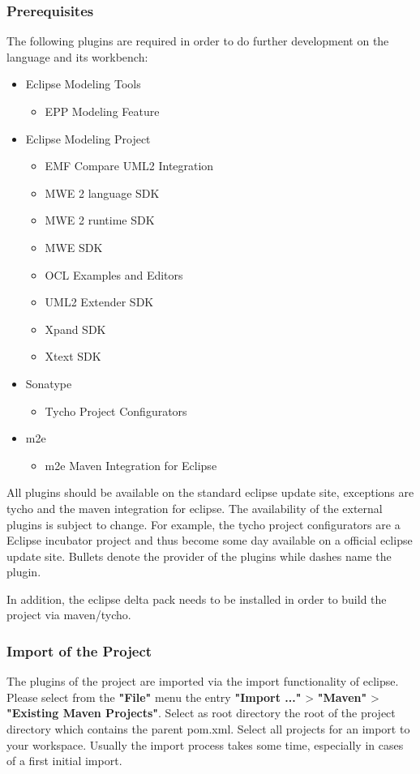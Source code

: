 \subsubsection{Prerequisites}
The following plugins are required in order to do further development on the 
language and its workbench: 
\begin{itemize}
  \item Eclipse Modeling Tools
  \begin{itemize}
    \item EPP Modeling Feature
  \end{itemize}
  \item Eclipse Modeling Project
  \begin{itemize}
    \item EMF Compare UML2 Integration
    \item MWE 2 language SDK
    \item MWE 2 runtime SDK
    \item MWE SDK
    \item OCL Examples and Editors
    \item UML2 Extender SDK
    \item Xpand SDK
    \item Xtext SDK
  \end{itemize}
  \item Sonatype
  \begin{itemize}
    \item Tycho Project Configurators
  \end{itemize}
  \item m2e
  \begin{itemize}
    \item m2e Maven Integration for Eclipse
  \end{itemize}
\end{itemize} 
All plugins should be available on the standard eclipse update site, exceptions
are tycho and the maven integration for eclipse. The availability of the 
external plugins is subject to change. For example, the tycho project 
configurators are a Eclipse incubator project and thus become some day available
on a official eclipse update site. Bullets denote the provider of the plugins
while dashes name the plugin.

In addition, the eclipse delta pack needs to be installed in order to build the 
project via maven/tycho.
 
\subsubsection{Import of the Project}
The plugins of the project are imported via the import functionality of eclipse.
Please select from the \textbf{"File"} menu the entry \textbf{"Import ..."} > 
\textbf{"Maven"} > \textbf{"Existing Maven Projects"}. Select as root
directory the root of the project directory which contains the parent pom.xml. 
Select all projects for an import to your workspace. Usually the import process
takes some time, especially in cases of a first initial import. 


